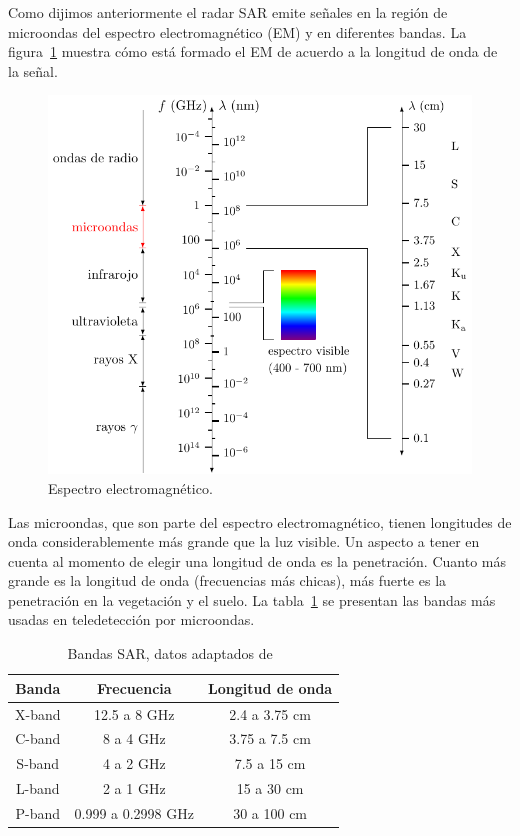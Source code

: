 Como dijimos anteriormente el radar SAR emite señales en la región de microondas del espectro electromagnético (EM) y en diferentes bandas. La figura~\ref{Espectro} muestra cómo está formado el EM de acuerdo a la longitud de onda de la señal.

\begin{figure}[hbt]
	\centering    
	\includegraphics[scale=1]{../../Figures/Tesis/Capitulo3/EEM.pdf}
	\caption{\label{Espectro}Espectro electromagnético.}
\end{figure}

Las microondas, que son parte del espectro electromagnético, tienen longitudes de onda considerablemente más grande que la luz visible. Un aspecto a tener en cuenta al momento de elegir una longitud de onda es la penetración. Cuanto más grande es la longitud de onda (frecuencias más chicas), más fuerte es la penetración en la vegetación y el suelo. La tabla~\ref{Bandas} se presentan las bandas más usadas en teledetección por microondas.

\begin{table}[H]
	\centering
	\begin{tabular}{ccc}
		\toprule
		\textbf{Banda}	& \textbf{Frecuencia}		    	& \textbf{Longitud de onda} \\ \midrule
		X-band			& 12.5 a 8 \si{\giga\hertz}         &  2.4 a 3.75 \si{\centi\meter} \\
		C-band			&  8 a 4 \si{\giga\hertz} 			&  3.75 a 7.5 \si{\centi\meter}\\
		S-band			&  4 a 2 \si{\giga\hertz} 	        &  7.5 a 15 \si{\centi\meter} \\
		L-band			&  2 a 1 \si{\giga\hertz} 	        &  15 a 30 \si{\centi\meter} \\
		P-band			&  0.999 a 0.2998 \si{\giga\hertz} 	&  30 a 100 \si{\centi\meter} \\
		\bottomrule
	\end{tabular}
	\caption{\label{Bandas}Bandas SAR, datos adaptados de~\cite{Sarmap2009}}
\end{table}

